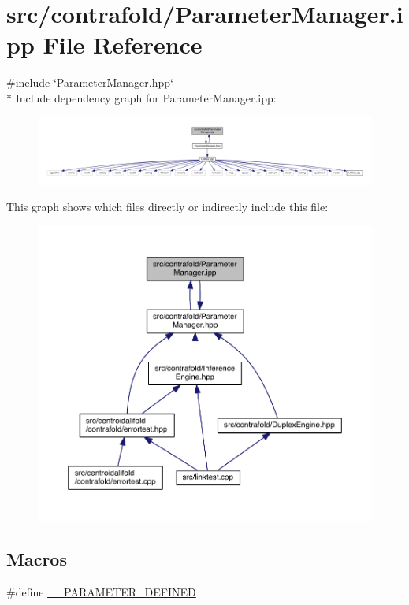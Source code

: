 \hypertarget{contrafold_2_parameter_manager_8ipp}{\section{src/contrafold/\+Parameter\+Manager.ipp File Reference}
\label{contrafold_2_parameter_manager_8ipp}
}
{\ttfamily \#include \char`\"{}Parameter\+Manager.\+hpp\char`\"{}}\\*
Include dependency graph for Parameter\+Manager.\+ipp\+:
\nopagebreak
\begin{figure}[H]
\begin{center}
\leavevmode
\includegraphics[width=350pt]{contrafold_2_parameter_manager_8ipp__incl}
\end{center}
\end{figure}
This graph shows which files directly or indirectly include this file\+:
\nopagebreak
\begin{figure}[H]
\begin{center}
\leavevmode
\includegraphics[width=350pt]{contrafold_2_parameter_manager_8ipp__dep__incl}
\end{center}
\end{figure}
\subsection*{Macros}
\begin{DoxyCompactItemize}
\item 
\#define \hyperlink{contrafold_2_parameter_manager_8ipp_a66cf9a216f534741a26c06972ff0f03e}{\+\_\+\+\_\+\+P\+A\+R\+A\+M\+E\+T\+E\+R\+\_\+\+D\+E\+F\+I\+N\+E\+D}
\end{DoxyCompactItemize}


